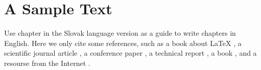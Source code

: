 \chapter{A Sample Text}

Use chapter in the Slovak language version as a guide
to write chapters in English. Here we only cite some references, such
as a book about LaTeX \cite{Oetiker2000}, a scientific journal article
\cite{clanok}, a conference paper \cite{clanok_na_konferencii}, a
technical report \cite{technical_report}, a book \cite{kniha}, and a
resourse from the Internet \cite{smernica}.
